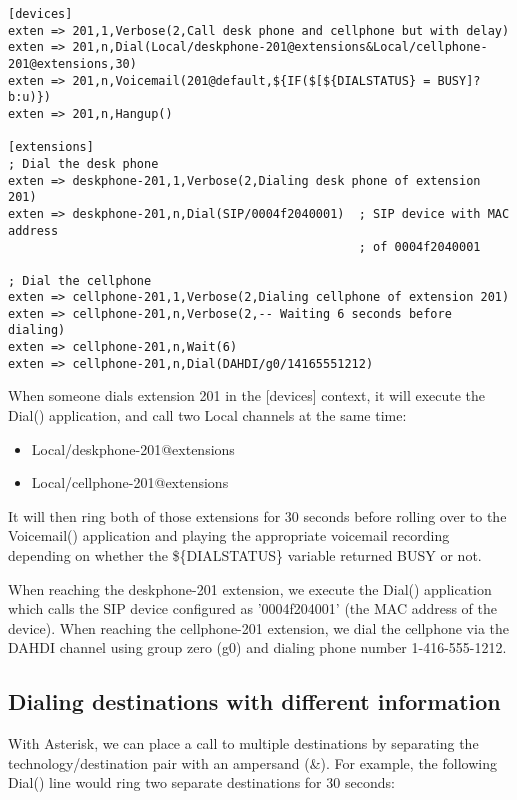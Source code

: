 \begin{astlisting}
\begin{verbatim}
[devices]
exten => 201,1,Verbose(2,Call desk phone and cellphone but with delay)
exten => 201,n,Dial(Local/deskphone-201@extensions&Local/cellphone-201@extensions,30)
exten => 201,n,Voicemail(201@default,${IF($[${DIALSTATUS} = BUSY]?b:u)})
exten => 201,n,Hangup()

[extensions]
; Dial the desk phone
exten => deskphone-201,1,Verbose(2,Dialing desk phone of extension 201)
exten => deskphone-201,n,Dial(SIP/0004f2040001)  ; SIP device with MAC address
                                                 ; of 0004f2040001

; Dial the cellphone
exten => cellphone-201,1,Verbose(2,Dialing cellphone of extension 201)
exten => cellphone-201,n,Verbose(2,-- Waiting 6 seconds before dialing)
exten => cellphone-201,n,Wait(6)
exten => cellphone-201,n,Dial(DAHDI/g0/14165551212)
\end{verbatim}
\end{astlisting}

When someone dials extension 201 in the [devices] context, it will execute the
Dial() application, and call two Local channels at the same time:

\begin{itemize}
\item Local/deskphone-201@extensions
\item Local/cellphone-201@extensions
\end{itemize}

It will then ring both of those extensions for 30 seconds before rolling over to
the Voicemail() application and playing the appropriate voicemail recording
depending on whether the \$\{DIALSTATUS\} variable returned BUSY or not.

When reaching the deskphone-201 extension, we execute the Dial() application
which calls the SIP device configured as '0004f204001' (the MAC address of the
device). When reaching the cellphone-201 extension, we dial the cellphone via
the DAHDI channel using group zero (g0) and dialing phone number 1-416-555-1212.

\subsection{Dialing destinations with different information}

With Asterisk, we can place a call to multiple destinations by separating the
technology/destination pair with an ampersand (\&). For example, the following
Dial() line would ring two separate destinations for 30 seconds:

